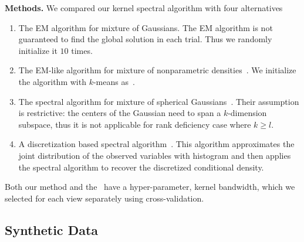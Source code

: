 \documentclass{article}
\begin{document}
{\bf Methods.} We compared our kernel spectral algorithm with four alternatives
\begin{enumerate}
  \vspace{-1mm}
  \item The EM algorithm for mixture of Gaussians. The EM algorithm is not guaranteed to find the global solution in each trial. Thus we randomly initialize it $10$ times.
  \item The EM-like algorithm for mixture of nonparametric densities~\citep{BenChaHun09}. We initialize the algorithm with $k$-means as~\citet{BenChaHun09}.
  \item The spectral algorithm for mixture of spherical Gaussians~\citep{HsuKak13}. Their assumption is restrictive: the centers of the Gaussian need to span a $k$-dimension subspace, thus it is not applicable for rank deficiency case where $k\ge l$.
  \item A discretization based spectral algorithm~\citep{HirKat10}. This algorithm approximates the joint distribution of the observed variables with histogram and then applies the spectral algorithm to recover the discretized conditional density.
  \vspace{-1mm}
\end{enumerate}
Both our method and the~\cite{BenChaHun09} have a hyper-parameter, kernel bandwidth, which we selected for each view separately using cross-validation.

\vspace{-3mm}
\subsection{Synthetic Data}
\vspace{-2mm}
\end{document}
